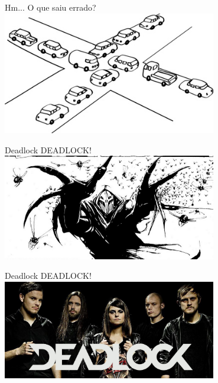 \documentclass{beamer}
\begin{document}
\begin{frame}[fragile]{Hm...}
  \centering
  \LARGE
  O que saiu errado?
  \includegraphics[width=0.7\textwidth]{deadlock1.jpeg}
\end{frame}


\begin{frame}[fragile]{Deadlock}
  \centering
  \LARGE
  DEADLOCK!
  \includegraphics[width=0.7\textwidth]{evil_deadlock.jpg}
\end{frame}

\begin{frame}[fragile]{Deadlock}
  \centering
  \LARGE
  DEADLOCK!
  \includegraphics[width=0.7\textwidth]{dead-lock-cover.jpg}
\end{frame}
\end{document}
